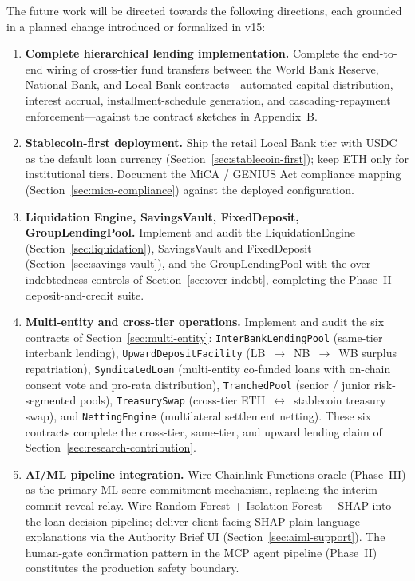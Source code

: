 \documentclass[12pt,a4paper]{report}
\begin{document}
The future work will be directed towards the following directions, each grounded in a planned change introduced or formalized in v15:
\label{sec:future-work}

\begin{enumerate}[noitemsep]
\item \textbf{Complete hierarchical lending implementation.} Complete the end-to-end wiring of cross-tier fund transfers between the World Bank Reserve, National Bank, and Local Bank contracts---automated capital distribution, interest accrual, installment-schedule generation, and cascading-repayment enforcement---against the contract sketches in Appendix~B.
\item \textbf{Stablecoin-first deployment.} Ship the retail Local Bank tier with USDC as the default loan currency (Section~\ref{sec:stablecoin-first}); keep ETH only for institutional tiers. Document the MiCA / GENIUS Act compliance mapping (Section~\ref{sec:mica-compliance}) against the deployed configuration.
\item \textbf{Liquidation Engine, SavingsVault, FixedDeposit, GroupLendingPool.} Implement and audit the LiquidationEngine (Section~\ref{sec:liquidation}), SavingsVault and FixedDeposit (Section~\ref{sec:savings-vault}), and the GroupLendingPool with the over-indebtedness controls of Section~\ref{sec:over-indebt}, completing the Phase~II deposit-and-credit suite.
\item \textbf{Multi-entity and cross-tier operations.} Implement and audit the six contracts of Section~\ref{sec:multi-entity}: \texttt{InterBankLendingPool} (same-tier interbank lending), \texttt{UpwardDepositFacility} (LB~$\to$~NB~$\to$~WB surplus repatriation), \texttt{SyndicatedLoan} (multi-entity co-funded loans with on-chain consent vote and pro-rata distribution), \texttt{TranchedPool} (senior / junior risk-segmented pools), \texttt{TreasurySwap} (cross-tier ETH~$\leftrightarrow$~stablecoin treasury swap), and \texttt{NettingEngine} (multilateral settlement netting). These six contracts complete the cross-tier, same-tier, and upward lending claim of Section~\ref{sec:research-contribution}.
\item \textbf{AI/ML pipeline integration.} Wire Chainlink Functions oracle (Phase~III) as the primary ML score commitment mechanism, replacing the interim commit-reveal relay. Wire Random Forest + Isolation Forest + SHAP into the loan decision pipeline; deliver client-facing SHAP plain-language explanations via the Authority Brief UI (Section~\ref{sec:aiml-support}). The human-gate confirmation pattern in the MCP agent pipeline (Phase~II) constitutes the production safety boundary.

\end{enumerate}
\end{document}
